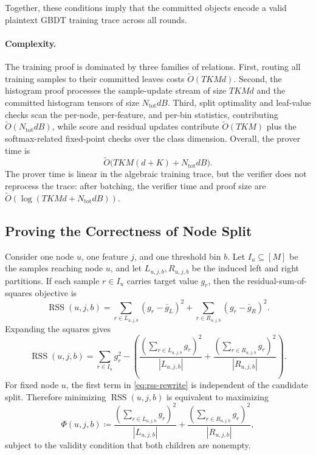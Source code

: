 Together, these conditions imply that the committed objects encode a valid
plaintext GBDT training trace across all rounds.

\paragraph{Complexity.}
The training proof is dominated by three families of relations. First, routing
all training samples to their committed leaves costs
$\tilde{O}(TKMd)$. Second, the histogram proof processes the sample-update
stream of size $TKMd$ and the committed histogram tensors of size
$N_{\mathrm{tot}}dB$. Third, split optimality and leaf-value checks scan the
per-node, per-feature, and per-bin statistics, contributing
$\tilde{O}(N_{\mathrm{tot}}dB)$, while score and residual updates contribute
$\tilde{O}(TKM)$ plus the softmax-related fixed-point checks over the class
dimension. Overall, the prover time is
\[
    \tilde{O}\bigl(TKM(d+K) + N_{\mathrm{tot}}dB\bigr).
\]
The prover time is linear in the algebraic training trace, but the verifier
does not reprocess the trace: after batching, the verifier time and proof size
are
$\tilde{O}(\log(TKMd+N_{\mathrm{tot}}dB))$.

\subsection{Proving the Correctness of Node Split}

Consider one node $u$, one feature $j$, and one threshold bin $b$. Let
$I_u \subseteq [M]$ be the samples reaching node $u$, and let
$L_{u,j,b},R_{u,j,b}$ be the induced left and right partitions. If each sample
$r\in I_u$ carries target value $g_r$, then the residual-sum-of-squares
objective is
\[
\operatorname{RSS}(u,j,b)
=
\sum_{r\in L_{u,j,b}}(g_r-\bar{g}_L)^2
+
\sum_{r\in R_{u,j,b}}(g_r-\bar{g}_R)^2.
\]
Expanding the squares gives
\begin{equation}\label{eq:rss-rewrite}
\operatorname{RSS}(u,j,b)
=
\sum_{r\in I_u} g_r^2
-
\left(
\frac{\left(\sum_{r\in L_{u,j,b}} g_r\right)^2}{|L_{u,j,b}|}
+
\frac{\left(\sum_{r\in R_{u,j,b}} g_r\right)^2}{|R_{u,j,b}|}
\right).
\end{equation}
For fixed node $u$, the first term in \eqref{eq:rss-rewrite} is independent of
the candidate split. Therefore minimizing $\operatorname{RSS}(u,j,b)$ is
equivalent to maximizing
\begin{equation}\label{eq:split-objective}
\Phi(u,j,b)
\coloneqq
\frac{\left(\sum_{r\in L_{u,j,b}} g_r\right)^2}{|L_{u,j,b}|}
+
\frac{\left(\sum_{r\in R_{u,j,b}} g_r\right)^2}{|R_{u,j,b}|},
\end{equation}
subject to the validity condition that both children are nonempty.

